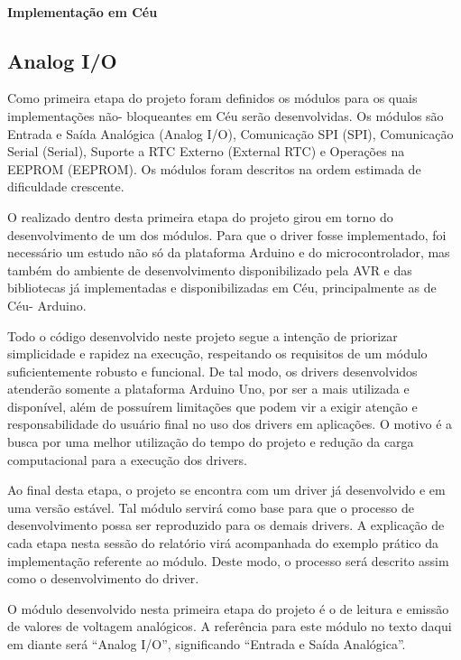 \documentclass{article}
\begin{document}
\paragraph{Implementação em Céu}


\subsection{Analog I/O}

\tab Como primeira etapa do projeto foram definidos os módulos para os quais implementações não-
bloqueantes em Céu serão desenvolvidas. Os módulos são Entrada e Saída Analógica (Analog
I/O), Comunicação SPI (SPI), Comunicação Serial (Serial), Suporte a RTC Externo
(External RTC) e Operações na EEPROM (EEPROM). Os módulos foram descritos na ordem
estimada de dificuldade crescente.
\par O realizado dentro desta primeira etapa do projeto girou em torno do desenvolvimento de um dos
módulos. Para que o driver fosse implementado, foi necessário um estudo não só da plataforma
Arduino e do microcontrolador, mas também do ambiente de desenvolvimento disponibilizado pela
AVR e das bibliotecas já implementadas e disponibilizadas em Céu, principalmente as de Céu-
Arduino.
\par Todo o código desenvolvido neste projeto segue a intenção de priorizar simplicidade e rapidez na
execução, respeitando os requisitos de um módulo suficientemente robusto e funcional. De tal
modo, os drivers desenvolvidos atenderão somente a plataforma Arduino Uno, por ser a mais
utilizada e disponível, além de possuírem limitações que podem vir a exigir atenção e
responsabilidade do usuário final no uso dos drivers em aplicações. O motivo é a busca por uma
melhor utilização do tempo do projeto e redução da carga computacional para a execução dos drivers.
\par Ao final desta etapa, o projeto se encontra com um driver já desenvolvido e em uma versão estável.
Tal módulo servirá como base para que o processo de desenvolvimento possa ser reproduzido para
os demais drivers. A explicação de cada etapa nesta sessão do relatório virá acompanhada do exemplo
prático da implementação referente ao módulo. Deste modo, o processo será descrito assim como o
desenvolvimento do driver.
\par O módulo desenvolvido nesta primeira etapa do projeto é o de leitura e emissão de valores de
voltagem analógicos. A referência para este módulo no texto daqui em diante será “Analog I/O”,
significando “Entrada e Saída Analógica”.
\end{document}
